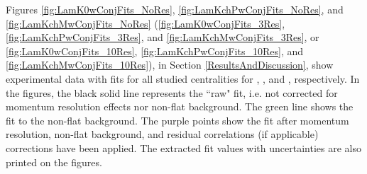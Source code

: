 \documentclass[../AnalysisNoteJBuxton.tex]{subfiles}
\begin{document}
Figures \ref{fig:LamK0wConjFits_NoRes}, \ref{fig:LamKchPwConjFits_NoRes}, and \ref{fig:LamKchMwConjFits_NoRes} (\ref{fig:LamK0wConjFits_3Res}, \ref{fig:LamKchPwConjFits_3Res}, and \ref{fig:LamKchMwConjFits_3Res}, or \ref{fig:LamK0wConjFits_10Res}, \ref{fig:LamKchPwConjFits_10Res}, and \ref{fig:LamKchMwConjFits_10Res}), in Section \ref{ResultsAndDiscussion}, show experimental data with fits for all studied centralities for \LamKsALamKs, \LamKchPALamKchM, and \LamKchMALamKchP, respectively.  In the figures, the black solid line represents the ``raw" fit, i.e. not corrected for momentum resolution effects nor non-flat background.  The green line shows the fit to the non-flat background.  The purple points show the fit after momentum resolution, non-flat background, and residual correlations (if applicable) corrections have been applied.  The extracted fit values with uncertainties are also printed on the figures.
\end{document}
